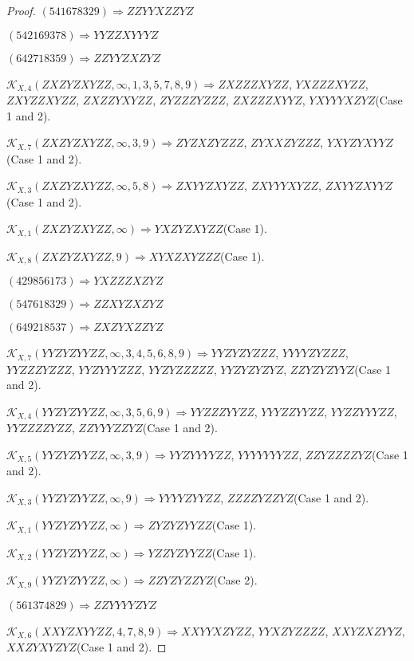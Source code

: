 \documentclass[12pt]{article}
\theoremstyle{plain}
\theoremstyle{definition}
\theoremstyle{remark}
\newcommand{\fancy}[1]{\mathcal{#1}}
\def\K{\fancy{K}}
\begin{document}
\begin{proof}
	$(5 4 1 6 7 8 3 2 9)\Rightarrow ZZYYXZZYZ$
	
	$(5 4 2 1 6 9 3 7 8)\Rightarrow YYZZXYYYZ$
	
	$(6 4 2 7 1 8 3 5 9)\Rightarrow ZZYYZXZYZ$
	
	
	
	$\K_{X,4}(ZXZYZXYZZ,\infty,1, 3, 5, 7, 8, 9)\Rightarrow $$ZXZZZXYZZ$, $YXZZZXYZZ$, $ZXYZZXYZZ$, $ZXZZYXYZZ$, $ZYZZZYZZZ$, $ZXZZZXYYZ$, $YXYYYXZYZ$(Case 1 and 2).
	
	$\K_{X,7}(ZXZYZXYZZ,\infty,3, 9)\Rightarrow $$ZYZXZYZZZ$, $ZYXXZYZZZ$, $YXYZYXYYZ$(Case 1 and 2).
	
	$\K_{X,3}(ZXZYZXYZZ,\infty,5, 8)\Rightarrow $$ZXYYZXYZZ$, $ZXYYYXYZZ$, $ZXYYZXYYZ$(Case 1 and 2).
	
	$\K_{X,1}(ZXZYZXYZZ,\infty)\Rightarrow $$YXZYZXYZZ$(Case 1).
	
	$\K_{X,8}(ZXZYZXYZZ,9)\Rightarrow $$XYXZXYZZZ$(Case 1).
	
	
	
	$(4 2 9 8 5 6 1 7 3)\Rightarrow YXZZZXZYZ$
	
	$(5 4 7 6 1 8 3 2 9)\Rightarrow ZZXYZXZYZ$
	
	$(6 4 9 2 1 8 5 3 7)\Rightarrow ZXZYXZZYZ$
	
	
	
	$\K_{X,7}(YYZYZYYZZ,\infty,3, 4, 5, 6, 8, 9)\Rightarrow $$YYZYZYZZZ$, $YYYYZYZZZ$, $YYZZZYZZZ$, $YYZYYYZZZ$, $YYZYZZZZZ$, $YYZYZYZYZ$, $ZZYZYZYYZ$(Case 1 and 2).
	
	$\K_{X,4}(YYZYZYYZZ,\infty,3, 5, 6, 9)\Rightarrow $$YYZZZYYZZ$, $YYYZZYYZZ$, $YYZZYYYZZ$, $YYZZZZYZZ$, $ZZYYYZZYZ$(Case 1 and 2).
	
	$\K_{X,5}(YYZYZYYZZ,\infty,3, 9)\Rightarrow $$YYZYYYYZZ$, $YYYYYYYZZ$, $ZZYZZZZYZ$(Case 1 and 2).
	
	$\K_{X,3}(YYZYZYYZZ,\infty,9)\Rightarrow $$YYYYZYYZZ$, $ZZZZYZZYZ$(Case 1 and 2).
	
	$\K_{X,1}(YYZYZYYZZ,\infty)\Rightarrow $$ZYZYZYYZZ$(Case 1).
	
	$\K_{X,2}(YYZYZYYZZ,\infty)\Rightarrow $$YZZYZYYZZ$(Case 1).
	
	$\K_{X,9}(YYZYZYYZZ,\infty)\Rightarrow $$ZZYZYZZYZ$(Case 2).
	
	
	
	$(5 6 1 3 7 4 8 2 9)\Rightarrow ZZYYYYZYZ$
	
	
	
	$\K_{X,6}(XXYZXYYZZ,4, 7, 8, 9)\Rightarrow $$XXYYXZYZZ$, $YYXZYZZZZ$, $XXYZXZYYZ$, $XXZYXYZYZ$(Case 1 and 2).
	

\end{proof}
\end{document}
